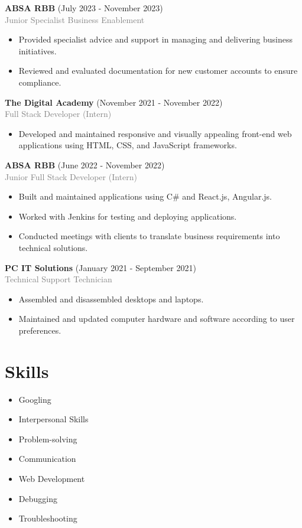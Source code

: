 \documentclass[a4paper,10pt]{article}
\begin{document}
\textbf{ABSA RBB} (July 2023 - November 2023)\\
\textcolor{gray}{Junior Specialist Business Enablement}
\begin{itemize}
    \item Provided specialist advice and support in managing and delivering business initiatives.
    \item Reviewed and evaluated documentation for new customer accounts to ensure compliance.
\end{itemize}

\textbf{The Digital Academy} (November 2021 - November 2022)\\
\textcolor{gray}{Full Stack Developer (Intern)}
\begin{itemize}
    \item Developed and maintained responsive and visually appealing front-end web applications using HTML, CSS, and JavaScript frameworks.
\end{itemize}

\textbf{ABSA RBB} (June 2022 - November 2022)\\
\textcolor{gray}{Junior Full Stack Developer (Intern)}
\begin{itemize}
    \item Built and maintained applications using C\# and React.js, Angular.js.
    \item Worked with Jenkins for testing and deploying applications.
    \item Conducted meetings with clients to translate business requirements into technical solutions.
\end{itemize}

\textbf{PC IT Solutions} (January 2021 - September 2021)\\
\textcolor{gray}{Technical Support Technician}
\begin{itemize}
    \item Assembled and disassembled desktops and laptops.
    \item Maintained and updated computer hardware and software according to user preferences.
\end{itemize}


\section{Skills}
\begin{minipage}{0.5\textwidth}
\begin{itemize}
    \item Googling
    \item Interpersonal Skills
    \item Problem-solving
    \item Communication
\end{itemize}
\end{minipage}%
\begin{minipage}{0.5\textwidth}
\begin{itemize}
    \item Web Development
    \item Debugging
    \item Troubleshooting
\end{itemize}
\end{minipage}
\end{document}
